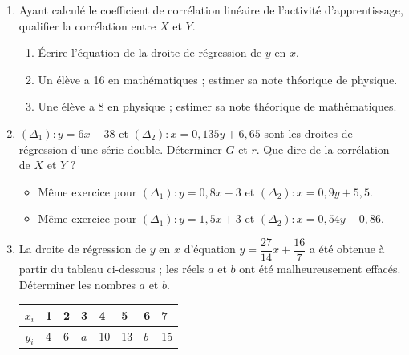 \documentclass[11pt,a4paper]{article}
\begin{document}
  \begin{enumerate}[label=\alph*)]
    \item Ayant calculé le coefficient de corrélation linéaire de l'activité
          d'apprentissage, qualifier la corrélation entre $X$ et $Y$.
          \begin{enumerate}[label=\roman*)]
            \item Écrire l'équation de la droite de régression de $y$ en $x$.
            \item Un élève a 16 en mathématiques ; estimer sa note théorique de
                  physique.
            \item Une élève a 8 en physique ; estimer sa note théorique de
                  mathématiques.
          \end{enumerate}

    \item $(\Delta_1) : y = 6x - 38$ et $(\Delta_2) : x = 0{,}135y + 6{,}65$
          sont les droites de régression d'une série double. Déterminer $G$ et
          $r$. Que dire de la corrélation de $X$ et $Y$ ?
          \begin{itemize}
            \item Même exercice pour $(\Delta_1) : y = 0{,}8x - 3$ et
                  $(\Delta_2) : x = 0{,}9y + 5{,}5$.
            \item Même exercice pour $(\Delta_1) : y = 1{,}5x + 3$ et
                  $(\Delta_2) : x = 0{,}54y - 0{,}86$.
          \end{itemize}

    \item La droite de régression de $y$ en $x$ d'équation
          $y = \dfrac{27}{14}x + \dfrac{16}{7}$ a été obtenue à partir du
          tableau ci-dessous ; les réels $a$ et $b$ ont été malheureusement
          effacés. Déterminer les nombres $a$ et $b$.
          \begin{center}
            \begin{tabular}{|c|*{7}{C{0.8cm}|}}
              \hline
              $x_i$ & 1 & 2 & 3 & 4 & 5 & 6 & 7\\ \hline
              $y_i$ & 4 & 6 & $a$ & 10 & 13 & $b$ & 15\\ \hline
            \end{tabular}
          \end{center}


\end{enumerate}
\end{document}
